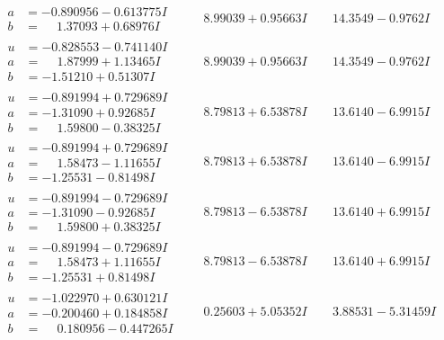 \documentclass[1p]{elsarticle_modified}
\theoremstyle{definition}
\begin{document}
$$\begin{array}{c|c|c}
\begin{aligned}
a &= -0.890956 - 0.613775 I \\
b &= \phantom{-}1.37093 + 0.68976 I\end{aligned}
 & \phantom{-}8.99039 + 0.95663 I & \phantom{-}14.3549 - 0.9762 I \\ \hline\begin{aligned}
u &= -0.828553 - 0.741140 I \\
a &= \phantom{-}1.87999 + 1.13465 I \\
b &= -1.51210 + 0.51307 I\end{aligned}
 & \phantom{-}8.99039 + 0.95663 I & \phantom{-}14.3549 - 0.9762 I \\ \hline\begin{aligned}
u &= -0.891994 + 0.729689 I \\
a &= -1.31090 + 0.92685 I \\
b &= \phantom{-}1.59800 - 0.38325 I\end{aligned}
 & \phantom{-}8.79813 + 6.53878 I & \phantom{-}13.6140 - 6.9915 I \\ \hline\begin{aligned}
u &= -0.891994 + 0.729689 I \\
a &= \phantom{-}1.58473 - 1.11655 I \\
b &= -1.25531 - 0.81498 I\end{aligned}
 & \phantom{-}8.79813 + 6.53878 I & \phantom{-}13.6140 - 6.9915 I \\ \hline\begin{aligned}
u &= -0.891994 - 0.729689 I \\
a &= -1.31090 - 0.92685 I \\
b &= \phantom{-}1.59800 + 0.38325 I\end{aligned}
 & \phantom{-}8.79813 - 6.53878 I & \phantom{-}13.6140 + 6.9915 I \\ \hline\begin{aligned}
u &= -0.891994 - 0.729689 I \\
a &= \phantom{-}1.58473 + 1.11655 I \\
b &= -1.25531 + 0.81498 I\end{aligned}
 & \phantom{-}8.79813 - 6.53878 I & \phantom{-}13.6140 + 6.9915 I \\ \hline\begin{aligned}
u &= -1.022970 + 0.630121 I \\
a &= -0.200460 + 0.184858 I \\
b &= \phantom{-}0.180956 - 0.447265 I\end{aligned}
 & \phantom{-}0.25603 + 5.05352 I & \phantom{-}3.88531 - 5.31459 I \\ \hline\begin{aligned}

\end{aligned}
\end{array}$$
\end{document}

